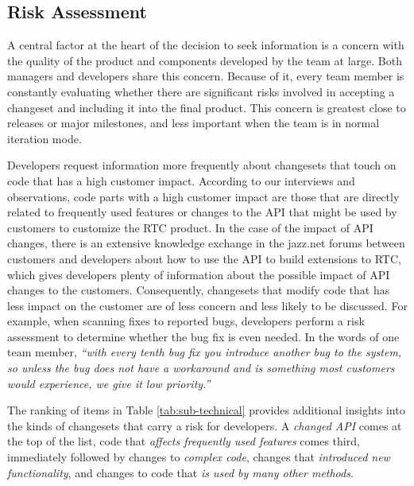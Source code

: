 \documentclass{sig-alternate}
\begin{document}


\subsection{Risk Assessment}

A central factor at the heart of the decision to seek information is a concern with the quality of the product and components developed by the team at large. Both managers and developers share this concern. Because of it, every team member is constantly evaluating whether there are significant risks involved in accepting a changeset and including it into the final product. This concern is greatest close to releases or major milestones, and less important when the team is in normal iteration mode.

Developers request information more frequently about changesets that touch on code that has a high customer impact. According to our interviews and observations, code parts with a high customer impact are those that are directly related to frequently used features or changes to the API that might be used by customers to customize the RTC product. In the case of the impact of API changes, there is an extensive knowledge exchange in the jazz.net forums between customers and developers about how to use the API to build extensions to RTC, which gives developers plenty of information about the possible impact of API changes to the customers. Consequently, changesets that modify code that has less impact on the customer are of less concern and less likely to be discussed. For example, when scanning fixes to reported bugs, developers perform a risk assessment to determine whether the bug fix is even needed. In the words of one team member, \emph{``with every tenth bug fix you introduce another bug to the system, so unless the bug does not have a workaround and is something most customers would experience, we give it low priority.''}

The ranking of items in Table \ref{tab:sub-technical} provides additional insights into the kinds of changesets that carry a risk for developers. A \emph{changed API} comes at the top of the list, code that \emph{affects frequently used features} comes third, immediately followed by changes to \emph{complex code}, changes that \emph{introduced new functionality}, and changes to code that \emph{is used by many other methods}.
\end{document}

